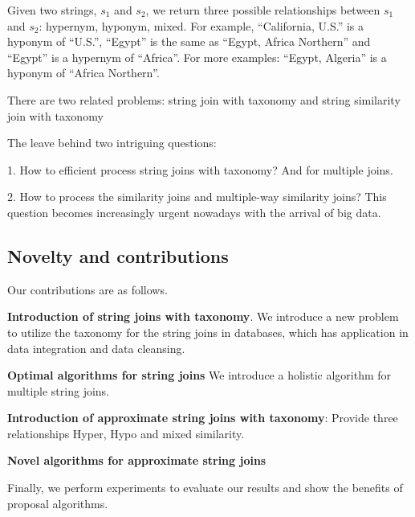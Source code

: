 \documentclass{sig-alternate}
\newtheorem{problem}[theorem]{Problem}
\begin{document}
Given two strings, $s_1$ and $s_2$, we return three possible relationships between $s_1$ and $s_2$: hypernym, hyponym, mixed. For example, ``California, U.S.'' is a hyponym of ``U.S.'', ``Egypt'' is the same as ``Egypt, Africa Northern'' and ``Egypt'' is a hypernym of ``Africa''. For more examples: ``Egypt, Algeria'' is a hyponym of ``Africa Northern''.

There are two related problems: string join with taxonomy and string similarity join with taxonomy

The leave behind two intriguing questions:

1. How to efficient process string joins with taxonomy? And for multiple joins.


2. How to process the similarity joins and multiple-way similarity joins?  This question becomes increasingly urgent nowadays with the arrival of big data.





\subsection{Novelty and contributions}


\smallskip


Our contributions are as follows.

\noindent \textbf{Introduction of string joins with taxonomy}. We introduce a new problem to utilize the taxonomy for the string joins in databases, which has application in data integration and data cleansing.

\noindent \textbf{Optimal algorithms for string joins} We introduce a holistic algorithm for multiple string joins.

\noindent \textbf{Introduction of approximate string joins with taxonomy}: Provide three relationships Hyper, Hypo and mixed similarity.

\noindent \textbf{Novel algorithms for approximate string joins}


Finally, we perform experiments to evaluate our results and show the benefits of proposal algorithms.
\end{document}
